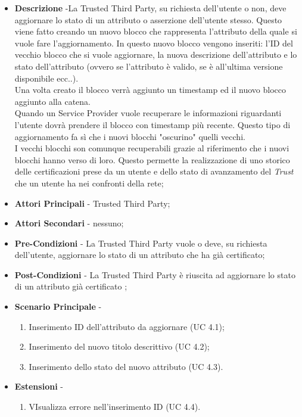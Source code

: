 \begin{itemize}
	\item \textbf{Descrizione} -La Trusted Third Party, su richiesta dell'utente o non, deve aggiornare lo stato di un attributo o asserzione dell'utente stesso.
	Questo viene fatto creando un nuovo blocco che rappresenta l'attributo della quale si vuole fare l'aggiornamento. In questo nuovo blocco vengono inseriti: l'ID del vecchio blocco che si vuole aggiornare, la nuova descrizione dell'attributo e lo stato dell'attributo (ovvero se l'attributo è valido, se è all'ultima versione disponibile ecc..).\\
	Una volta creato il blocco verrà aggiunto un timestamp ed il nuovo blocco aggiunto alla catena.\\
	Quando un Service Provider vuole recuperare le informazioni riguardanti l'utente dovrà prendere il blocco con timestamp più recente. Questo tipo di aggiornamento fa sì che i nuovi blocchi "oscurino" quelli vecchi.\\
	I vecchi blocchi son comunque recuperabili grazie al riferimento che i nuovi blocchi hanno verso di loro. Questo permette la realizzazione di uno storico delle certificazioni prese da un utente e dello stato di avanzamento del \textit{Trust} che un utente ha nei confronti della rete;
	\item \textbf{Attori Principali} - Trusted Third Party;
	\item \textbf{Attori Secondari} - nessuno;
	\item \textbf{Pre-Condizioni} - La Trusted Third Party vuole o deve, su richiesta dell'utente, aggiornare lo stato di un attributo che ha già certificato;
	\item \textbf{Post-Condizioni} - La Trusted Third Party è riuscita ad aggiornare lo stato di un attributo già certificato ;
	\item \textbf{Scenario Principale} -
	\begin{enumerate}
		\item Inserimento ID dell'attributo da aggiornare (UC 4.1);
		\item Inserimento del nuovo titolo descrittivo (UC 4.2);
		\item Inserimento dello stato del nuovo attributo (UC 4.3).
	\end{enumerate}
	\item \textbf{Estensioni} -
	\begin{enumerate}
		\item VIsualizza errore nell'inserimento ID (UC 4.4).
	\end{enumerate}
\end{itemize}
